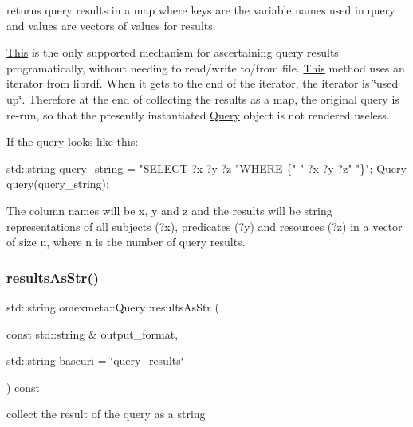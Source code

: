 returns query results in a map where keys are the variable names used in query and values are vectors of values for results. 

\hyperlink{classThis}{This} is the only supported mechanism for ascertaining query results programatically, without needing to read/write to/from file. \hyperlink{classThis}{This} method uses an iterator from librdf. When it gets to the end of the iterator, the iterator is \char`\"{}used up\char`\"{}. Therefore at the end of collecting the results as a map, the original query is re-\/run, so that the presently instantiated \hyperlink{classomexmeta_1_1Query}{Query} object is not rendered useless.

If the query looks like this\+: 
\begin{DoxyCode}
std::string query\_string =   \textcolor{stringliteral}{"SELECT ?x ?y ?z}
\textcolor{stringliteral}{                             "}WHERE \{\textcolor{stringliteral}{"}
\textcolor{stringliteral}{                             "}   ?x ?y ?z\textcolor{stringliteral}{"}
\textcolor{stringliteral}{                             "}\}\textcolor{stringliteral}{";}
\textcolor{stringliteral}{Query query(query\_string);}
\end{DoxyCode}
 The column names will be x, y and z and the results will be string representations of all subjects (?x), predicates (?y) and resources (?z) in a vector of size {\ttfamily n}, where n is the number of query results. \mbox{\label{classomexmeta_1_1Query_a7109dd08bd808bf5a20becb164622ed6}} 
\subsubsection{\texorpdfstring{results\+As\+Str()}{resultsAsStr()}}
{\footnotesize\ttfamily std\+::string omexmeta\+::\+Query\+::results\+As\+Str (\begin{DoxyParamCaption}\item[{const std\+::string \&}]{output\+\_\+format,  }\item[{std\+::string}]{baseuri = {\ttfamily \char`\"{}query\+\_\+results\char`\"{}} }\end{DoxyParamCaption}) const}



collect the result of the query as a string 


